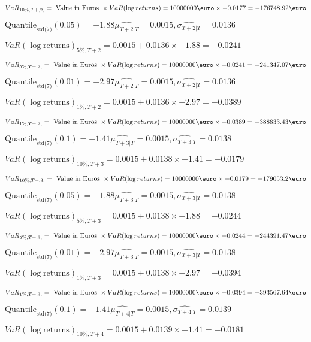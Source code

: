 $VaR_{10\%, T + ,2,} = \text{ Value in Euros } \times VaR(\log returns) = 10 000 000 \text{\euro} \times-0.0177 = -176748.92 \text{\euro}$


$\text{Quantile}_\text{std(7)}(0.05) = -1.88$$\hat{\mu_{T+2|T}} = 0.0015, \hat{\sigma_{T+2|T}} = 0.0136$

$VaR(\log \text{returns})_{5\%, T + 2} = 0.0015 + 0.0136\times-1.88 = -0.0241$

$VaR_{5\%, T + ,2,} = \text{ Value in Euros } \times VaR(\log returns) = 10 000 000 \text{\euro} \times-0.0241 = -241347.07 \text{\euro}$


$\text{Quantile}_\text{std(7)}(0.01) = -2.97$$\hat{\mu_{T+2|T}} = 0.0015, \hat{\sigma_{T+2|T}} = 0.0136$

$VaR(\log \text{returns})_{1\%, T + 2} = 0.0015 + 0.0136\times-2.97 = -0.0389$

$VaR_{1\%, T + ,2,} = \text{ Value in Euros } \times VaR(\log returns) = 10 000 000 \text{\euro} \times-0.0389 = -388833.43 \text{\euro}$


$\text{Quantile}_\text{std(7)}(0.1) = -1.41$$\hat{\mu_{T+3|T}} = 0.0015, \hat{\sigma_{T+3|T}} = 0.0138$

$VaR(\log \text{returns})_{10\%, T + 3} = 0.0015 + 0.0138\times-1.41 = -0.0179$

$VaR_{10\%, T + ,3,} = \text{ Value in Euros } \times VaR(\log returns) = 10 000 000 \text{\euro} \times-0.0179 = -179053.2 \text{\euro}$


$\text{Quantile}_\text{std(7)}(0.05) = -1.88$$\hat{\mu_{T+3|T}} = 0.0015, \hat{\sigma_{T+3|T}} = 0.0138$

$VaR(\log \text{returns})_{5\%, T + 3} = 0.0015 + 0.0138\times-1.88 = -0.0244$

$VaR_{5\%, T + ,3,} = \text{ Value in Euros } \times VaR(\log returns) = 10 000 000 \text{\euro} \times-0.0244 = -244391.47 \text{\euro}$


$\text{Quantile}_\text{std(7)}(0.01) = -2.97$$\hat{\mu_{T+3|T}} = 0.0015, \hat{\sigma_{T+3|T}} = 0.0138$

$VaR(\log \text{returns})_{1\%, T + 3} = 0.0015 + 0.0138\times-2.97 = -0.0394$

$VaR_{1\%, T + ,3,} = \text{ Value in Euros } \times VaR(\log returns) = 10 000 000 \text{\euro} \times-0.0394 = -393567.64 \text{\euro}$


$\text{Quantile}_\text{std(7)}(0.1) = -1.41$$\hat{\mu_{T+4|T}} = 0.0015, \hat{\sigma_{T+4|T}} = 0.0139$

$VaR(\log \text{returns})_{10\%, T + 4} = 0.0015 + 0.0139\times-1.41 = -0.0181$

